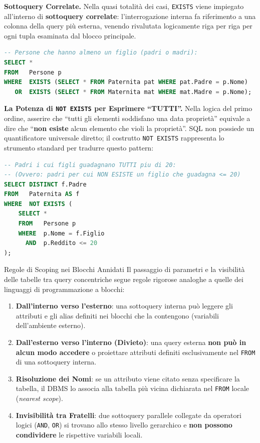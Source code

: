 \documentclass[12pt]{extarticle}
\begin{document}
\medskip
\noindent \textbf{Sottoquery Correlate.} Nella quasi totalità dei casi, \texttt{EXISTS} viene impiegato all'interno di \textbf{sottoquery correlate}: l'interrogazione interna fa riferimento a una colonna della query più esterna, venendo rivalutata logicamente riga per riga per ogni tupla esaminata dal blocco principale.

\begin{lstlisting}[language=SQL]
-- Persone che hanno almeno un figlio (padri o madri):
SELECT *
FROM   Persone p
WHERE  EXISTS (SELECT * FROM Paternita pat WHERE pat.Padre = p.Nome)
   OR  EXISTS (SELECT * FROM Maternita mat WHERE mat.Madre = p.Nome);
\end{lstlisting}

\medskip
\noindent \textbf{La Potenza di \texttt{NOT EXISTS} per Esprimere ``TUTTI''.} Nella logica del primo ordine, asserire che ``tutti gli elementi soddisfano una data proprietà'' equivale a dire che ``\textbf{non esiste} alcun elemento che violi la proprietà''. SQL non possiede un quantificatore universale diretto; il costrutto \texttt{NOT EXISTS} rappresenta lo strumento standard per tradurre questo pattern:

\begin{lstlisting}[language=SQL]
-- Padri i cui figli guadagnano TUTTI piu di 20:
-- (Ovvero: padri per cui NON ESISTE un figlio che guadagna <= 20)
SELECT DISTINCT f.Padre
FROM   Paternita AS f
WHERE  NOT EXISTS (
    SELECT *
    FROM   Persone p
    WHERE  p.Nome = f.Figlio
      AND  p.Reddito <= 20
);
\end{lstlisting}

\begin{cbox}{Regole di Scoping nei Blocchi Annidati}
\noindent Il passaggio di parametri e la visibilità delle tabelle tra query concentriche segue regole rigorose analoghe a quelle dei linguaggi di programmazione a blocchi:
\begin{enumerate}
    \item \textbf{Dall'interno verso l'esterno}: una sottoquery interna può leggere gli attributi e gli alias definiti nei blocchi che la contengono (variabili dell'ambiente esterno).
    \item \textbf{Dall'esterno verso l'interno (Divieto)}: una query esterna \textbf{non può in alcun modo accedere} o proiettare attributi definiti esclusivamente nel \texttt{FROM} di una sottoquery interna.
    \item \textbf{Risoluzione dei Nomi}: se un attributo viene citato senza specificare la tabella, il DBMS lo associa alla tabella più vicina dichiarata nel \texttt{FROM} locale (\textit{nearest scope}).
    \item \textbf{Invisibilità tra Fratelli}: due sottoquery parallele collegate da operatori logici (\texttt{AND}, \texttt{OR}) si trovano allo stesso livello gerarchico e \textbf{non possono condividere} le rispettive variabili locali.
\end{enumerate}
\end{cbox}
\end{document}
